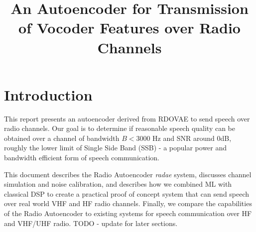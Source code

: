 \documentclass{article}
\begin{document}


\title{An Autoencoder for Transmission of Vocoder Features over Radio Channels}
\maketitle

\section{Introduction}

This report presents an autoencoder derived from RDOVAE \cite{valin2023lowbitrate} to send speech over radio channels.  Our goal is to determine if reasonable speech quality can be obtained over a channel of bandwidth $B<3000$ Hz and SNR around 0dB, roughly the lower limit of Single Side Band (SSB) - a popular power and bandwidth efficient form of speech communication.

This document describes the Radio Autoencoder \emph{radae} system, discusses channel simulation and noise calibration, and describes how we combined ML with classical DSP to create a practical proof of concept system that can send speech over real world VHF and HF radio channels.  Finally, we compare the capabilities of the Radio Autoencoder to existing systems for speech communication over HF and VHF/UHF radio. TODO - update for later sections.
\end{document}
